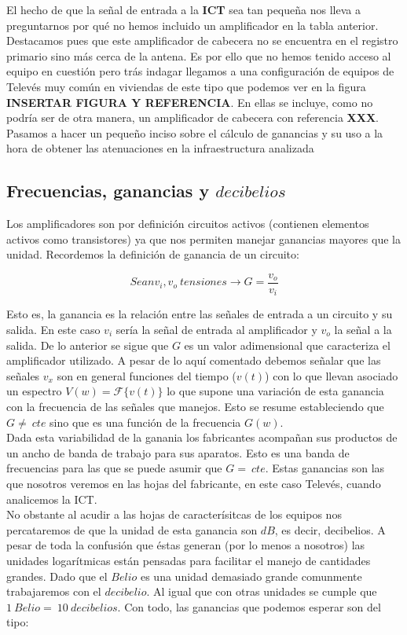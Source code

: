 \documentclass{article}[12 pt]
\begin{document}
		El hecho de que la señal de entrada a la \textbf{ICT} sea tan pequeña nos lleva a preguntarnos por qué no hemos incluido un amplificador en la tabla anterior. Destacamos pues que este amplificador de cabecera no se encuentra en el registro primario sino más cerca de la antena. Es por ello que no hemos tenido acceso al equipo en cuestión pero trás indagar llegamos a una configuración de equipos de Televés muy común en viviendas de este tipo que podemos ver en la figura \textbf{INSERTAR FIGURA Y REFERENCIA}. En ellas se incluye, como no podría ser de otra manera, un amplificador de cabecera con referencia \textbf{XXX}. Pasamos a hacer un pequeño inciso sobre el cálculo de ganancias y su uso a la hora de obtener las atenuaciones en la infraestructura analizada\\

		\subsection{Frecuencias, ganancias y $decibelios$}
			Los amplificadores son por definición circuitos activos (contienen elementos activos como transistores) ya que nos permiten manejar ganancias mayores que la unidad. Recordemos la definición de ganancia de un circuito:

			$$Sean v_i, v_o\ tensiones \rightarrow G = \frac{v_o}{v_i}$$

			Esto es, la ganancia es la relación entre las señales de entrada a un circuito y su salida. En este caso $v_i$ sería la señal de entrada al amplificador y $v_o$ la señal a la salida. De lo anterior se sigue que $G$ es un valor adimensional que caracteriza el amplificador utilizado. A pesar de lo aquí comentado debemos señalar que las señales $v_x$ son en general funciones del tiempo ($v(t)$) con lo que llevan asociado un espectro $V(w) = \mathcal{F}\{v(t)\}$ lo que supone una variación de esta ganancia con la frecuencia de las señales que manejos. Esto se resume estableciendo que $G \neq\ cte$ sino que es una función de la frecuencia $G(w)$.\\

			Dada esta variabilidad de la ganania los fabricantes acompañan sus productos de un ancho de banda de trabajo para sus aparatos. Esto es una banda de frecuencias para las que se puede asumir que $G =\ cte$. Estas ganancias son las que nosotros veremos en las hojas del fabricante, en este caso Televés, cuando analicemos la ICT.\\

			No obstante al acudir a las hojas de caracterísitcas de los equipos nos percataremos de que la unidad de esta ganancia son $dB$, es decir, decibelios. A pesar de toda la confusión que éstas generan (por lo menos a nosotros) las unidades logarítmicas están pensadas para facilitar el manejo de cantidades grandes. Dado que el $Belio$ es una unidad demasiado grande comunmente trabajaremos con el $decibelio$. Al igual que con otras unidades se cumple que $1\ Belio =\ 10\ decibelios$. Con todo, las ganancias que podemos esperar son del tipo:
\end{document}
